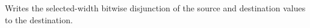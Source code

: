 Writes the selected-width bitwise disjunction of the source and destination values to the destination.
